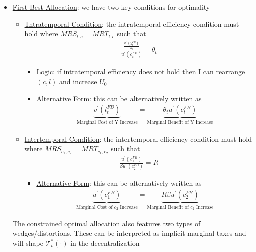\documentclass{article}
\begin{document}
\begin{itemize}
    \item  \underline{First Best Allocation}: we have two key conditions for optimality
    \begin{itemize}
        \item  \underline{Tntratemporal Condition}: the intratemporal efficiency condition must hold where $MRS_{l, c} = MRT_{l,c}$ such that
        \begin{gather*}
            \frac{\tfrac{v^{'}(y_{t}^{FB})}{\theta_{t}}}{u^{'}(c_{t}^{FB})} = \theta_{t}
        \end{gather*}
        \begin{itemize}
            \item  \underline{Logic}: if intratemporal efficiency does not hold then I can rearrange $(c, l)$ and increase $U_{0}$
            \item  \underline{Alternative Form}: this can be alternatively written as
            \begin{gather*}
                \underbrace{v^{'}(l_{t}^{FB})}_{\text{Marginal Cost of Y Increase}} = \underbrace{\theta_{t} u^{'}(c_{t}^{FB})}_{\text{Marginal Benefit of Y Increase}}
            \end{gather*}
        \end{itemize}
        \item  \underline{Intertemporal Condition}: the intertemporal efficiency condition must hold where $MRS_{c_{1}, c_{2}} = MRT_{c_{1}, c_{2}}$ such that
        \begin{gather*}
            \frac{u^{'}(c_{1}^{FB})}{\beta u^{'}(c_{2}^{FB})} = R
        \end{gather*}
        \begin{itemize}
            \item  \underline{Alternative Form}: this can be alternatively written as
            \begin{gather*}
                \underbrace{u^{'}(c_{1}^{FB})}_{\text{Marginal Cost of $c_{2}$ Increase}} = \underbrace{R \beta u^{'}(c_{2}^{FB})}_{\text{Marginal Benefit of $c_{2}$ Increase}}
            \end{gather*}
        \end{itemize}
    \end{itemize}
    The constrained optimal allocation also features two types of wedges/distortions. These can be interpreted as implicit marginal taxes and will shape $\mathcal{T}_{t}^{*}(\cdot)$ in the decentralization
    \begin{itemize}

\end{itemize}
\end{itemize}
\end{document}
